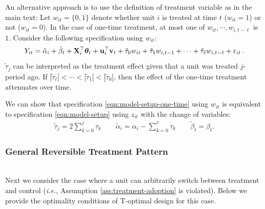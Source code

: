 An alternative approach is to use the definition of treatment variable as in the main text: Let $w_{it} = \{0,1\}$ denote whether unit $i$ is treated at time $t$ ($w_{it} = 1$) or not ($w_{it} = 0$). In the case of one-time treatment, at most one of $w_{it}, \cdots, w_{i,t-\ell}$ is $1$. Consider the following specification using $w_{it}$:
\begin{equation}\label{eqn:model-setup-one-time}
    Y_{it}  = \tilde\alpha_i +  \tilde\beta_t + \mathbf{X}_i^\top  \bm{\theta}_t + \mathbf{u}_i^\top \mathbf{v}_t + \tilde\tau_0 w_{it} + \tilde\tau_1 w_{i,t-1} + \cdots + \tilde\tau_{\ell} w_{i,t-\ell}  + \varepsilon_{it}\,.
\end{equation}
$\tilde\tau_j$ can be interpreted as the treatment effect given that a unit was treated $j$-period ago. If $|\tilde \tau_\ell| < \cdots < |\tilde \tau_1| < |\tilde \tau_0| $, then the effect of the one-time treatment attenuates over time.

We can show that specification \eqref{eqn:model-setup-one-time} using $w_{it}$ is equivalent to specification \eqref{eqn:model-setup} using $z_{it}$ with the change of variables:
\begin{align*}
    \tilde\tau_j = 2 \sum_{k = 0}^j \tau_k \qquad \tilde\alpha_i = \alpha_i -\sum_{k = 0}^\ell \tau_k \qquad \tilde\beta_t = \beta_t.
\end{align*}

\subsubsection{General Reversible Treatment Pattern}\label{subsubsec:general-reversible-treatment}
\texttt{} \\
Next we consider the case where a unit can arbitrarily switch between treatment and control ({\it i.e.}, Assumption \ref{ass:treatment-adoption} is violated). Below we provide the optimality conditions of T-optimal design for this case. 

